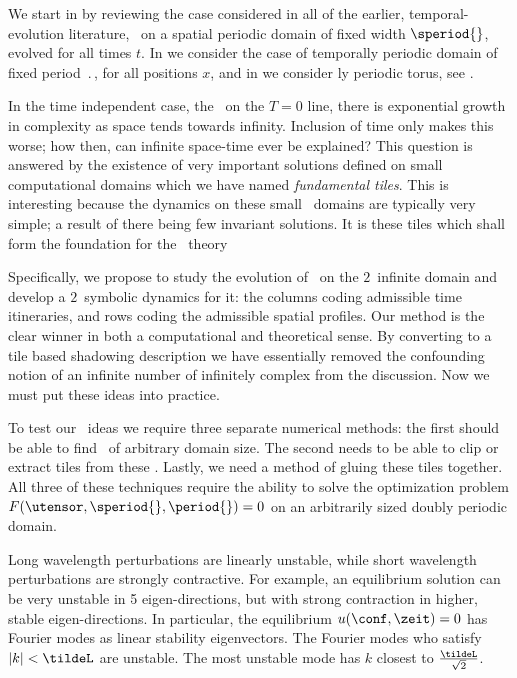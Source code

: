 We start in   by reviewing the case considered in
all of the earlier, temporal-evolution literature, \KS\ on a spatial periodic
domain of fixed width $\speriod{}$, evolved for all times $t$.
In  we consider the case of temporally periodic
domain of fixed period $\period{}$,  for all positions $x$,
and
in  we consider {\spt}ly periodic torus, see
.

In the time independent case, the \KSe\ on the $T=0$ line,
there is exponential growth in complexity
as space tends towards infinity. Inclusion of time
only makes this worse; how then, can infinite space-time ever
be explained? This question is answered by the existence
of very important solutions defined on small computational domains
which we have named \textit{fundamental tiles}. This is interesting
because the dynamics on these small \spt\ domains are typically
very simple; a result of there being few invariant solutions.
It is these tiles which shall form the foundation for the
\spt\ theory

Specifically, we propose to study the evolution of \KS\ on the $2$\dmn\
infinite {\spt}domain and develop a $2$\dmn\ symbolic dynamics for it:
the columns coding admissible time itineraries, and rows coding the
admissible spatial profiles. Our {\spt} method is the clear winner in
both a computational and theoretical sense. By converting to a tile based
shadowing description we have essentially removed the confounding notion
of an infinite number of infinitely complex {\twots} from the discussion.
Now we must put these ideas into practice.

To test our \spt\ ideas we require three separate numerical methods: the first
should be able to find \twots\ of arbitrary domain size. The second needs to be able to
clip or extract tiles from these \twots. Lastly, we need a method of
gluing these tiles together. All three of these techniques require the ability
to solve the optimization problem $F(\utensor,\speriod{},\period{})=0$
on an arbitrarily sized doubly periodic domain.

Long wavelength perturbations are linearly unstable, while short
wavelength perturbations are strongly contractive. For example, an
equilibrium solution can be very unstable in 5 eigen-directions, but with
strong contraction in higher, stable eigen-directions. In particular, the
equilibrium $u(\conf,\zeit)=0$ has Fourier modes as linear stability
eigenvectors. The Fourier modes who satisfy $|k|<\tildeL$ are unstable.
The most unstable mode has $k$ closest to $\frac{\tildeL}{\sqrt{2}}$.

